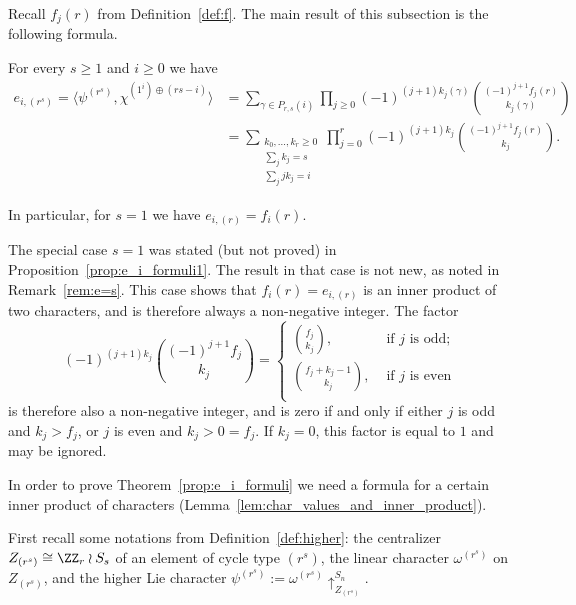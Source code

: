 Recall $f_j(r)$ from Definition~\ref{def:f}. 
The main result of this subsection is the following formula.

\begin{theorem}\label{prop:e_i_formuli}
    For every $s\geq 1$ and $i\geq 0$ we have
    \begin{align*}
        e_{i,(r^s)}
        = \langle \psi^{(r^s)}, \chi^{(1^i) \oplus (rs-i)} \rangle 
        &= \sum_{\gamma\in P_{r,s}(i)} \prod_{j \ge 0}
        (-1)^{(j+1)k_j(\gamma)} \binom{(-1)^{j+1} f_j(r)}{k_j(\gamma)} \\
        &= \sum_{\substack{k_0, \dots, k_r \ge 0 \\ \sum_j k_j = s \\ \sum_j jk_j = i}} \prod_{j = 0}^{r}
        (-1)^{(j+1)k_j} \binom{(-1)^{j+1} f_j(r)}{k_j}.
    \end{align*}
		
    In particular, for $s=1$ we have $e_{i,(r)} = f_i(r)$.
\end{theorem}

\begin{remark}\label{rem:when_factor_is_zero}
    The special case $s=1$ was stated (but not proved) in  Proposition~\ref{prop:e_i_formuli1}.
    The result in that case is not new, as noted in Remark~\ref{rem:e=s}. 
    This case
    shows that $f_i(r) = e_{i,(r)}$ is an inner product of two characters, and is therefore always a non-negative integer. The factor
    \[
        (-1)^{(j+1)k_j} \binom{(-1)^{j+1} f_j}{k_j}
        = \begin{cases}
            \binom{f_j}{k_j}, &\text{ if } j \text{ is odd;}\\
            \binom{f_j+k_j-1}{k_j}, &\text{ if } j \text{ is even}\\
        \end{cases}
    \]
    is therefore also a non-negative integer,
    and is zero if and only if 
    either $j$ is odd and $k_j > f_j$,
    or $j$ is even and $k_j > 0 = f_j$.
    If $k_j = 0$, this factor is equal to $1$ and may be ignored.
\end{remark}
    
In order to prove Theorem~\ref{prop:e_i_formuli} we need a formula for a certain inner product of characters (Lemma~\ref{lem:char_values_and_inner_product}).

First recall some notations from Definition~\ref{def:higher}:
the centralizer $Z_{(r^s)} \cong \ZZ_r \wr S_s$ of an element of cycle type $(r^s)$,
the linear character $\omega^{(r^s)}$ on $Z_{(r^s)}$, 
and the higher Lie character
$\psi^{(r^s)} := \omega^{(r^s)}\uparrow_{Z_{(r^s)}}^{S_n}$. 

